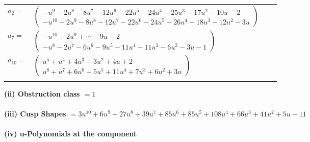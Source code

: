 \documentclass[1p]{elsarticle_modified}
\theoremstyle{definition}
\begin{document}
\begin{tabular}{m{7pt} m{180pt} m{7pt} m{180pt} }
\flushright $a_{2}=$&$\begin{pmatrix}- u^9-2 u^8-8 u^7-12 u^6-22 u^5-24 u^4-25 u^3-17 u^2-10 u-2\\- u^{10}-2 u^9-8 u^8-12 u^7-22 u^6-24 u^5-26 u^4-18 u^3-12 u^2-3 u\end{pmatrix}$ \\
\flushright $a_{7}=$&$\begin{pmatrix}- u^{10}-2 u^9+\cdots-9 u-2\\- u^8-2 u^7-6 u^6-9 u^5-11 u^4-11 u^3-6 u^2-3 u-1\end{pmatrix}$ \\
\flushright $a_{10}=$&$\begin{pmatrix}u^5+u^4+4 u^3+3 u^2+4 u+2\\u^8+u^7+6 u^6+5 u^5+11 u^4+7 u^3+6 u^2+3 u\end{pmatrix}$\\&\end{tabular}
\flushleft \textbf{(ii) Obstruction class $= 1$}\\~\\
\flushleft \textbf{(iii) Cusp Shapes $= 3 u^{10}+6 u^9+27 u^8+39 u^7+85 u^6+85 u^5+108 u^4+66 u^3+41 u^2+5 u-11$}\\~\\
\newpage\renewcommand{\arraystretch}{1}
\flushleft \textbf{(iv) u-Polynomials at the component}\newline \\
\end{document}

